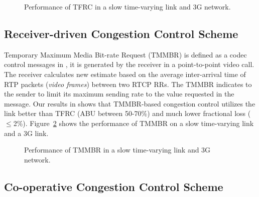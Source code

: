 \begin{figure}
  \centerline{
  }
  \caption{Performance of TFRC in a slow time-varying link and 3G network.}
  \label{fig:tfrc}
\end{figure}


\subsection{Receiver-driven Congestion Control Scheme}

Temporary Maximum Media Bit-rate Request (TMMBR) is defined as a codec control
messages in \cite{rfc5104}, it is generated by the receiver in a
point-to-point video call. The receiver calculates new estimate based on the
average inter-arrival time of RTP packets (\emph{video frames}) between two
RTCP RRs. The TMMBR indicates to the sender to limit its maximum sending rate
to the value requested in the message. Our results in  shows
that TMMBR-based congestion control utilizes the link better than TFRC (ABU
between 50-70\%) and much lower fractional loss ($\le$2\%).
Figure~\ref{fig:tmmbr} shows the performance of TMMBR on a slow time-varying
link and a 3G link.

\begin{figure}
  \centerline{
  }
  \caption{Performance of TMMBR in a slow time-varying link and 3G network.}
  \label{fig:tmmbr}
\end{figure}

\subsection{Co-operative Congestion Control Scheme}

